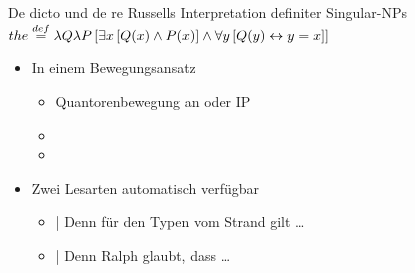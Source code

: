 \begin{frame}
  {De dicto und de re}
  \onslide<+->
  \onslide<+->
  Russells Interpretation definiter Singular-NPs\\
  \onslide<+->
  \alert{$the\stackrel{def}{=}\lambda{Q}\lambda{}P\left[{}\exists{x}\left[{}Q(x)\wedge{}P(x)\right]\wedge\forall{}y\left[{}Q(y)\leftrightarrow y=x\right]\right]$}\\
  \Halbzeile
  \begin{itemize}[<+->]
    \item In einem Bewegungsansatz 
      \begin{itemize}[<+->]
        \item Quantorenbewegung an  oder  IP
        \item {}
        \item {}
      \end{itemize}
      \Halbzeile
    \item Zwei Lesarten automatisch verfügbar
      \begin{itemize}[<+->]
        \item {} |  Denn für den Typen vom Strand gilt \ldots
        \item {} |  Denn Ralph glaubt, dass \ldots
      \end{itemize}
  \end{itemize}
\end{frame}

